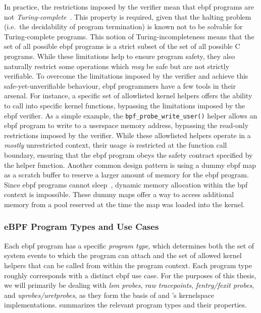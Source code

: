 In practice, the restrictions imposed by the verifier mean that \gls{ebpf} programs are not
\textit{Turing-complete}~\cite{gregg2019_bpf}.  This property is required, given that the
halting problem (i.e.~the decidability of program termination) is known not to be solvable
for Turing-complete programs. This notion of Turing-incompleteness means that the set of
all possible \gls{ebpf} programs is a strict subset of the set of all possible C programs. While
these limitations help to ensure program safety, they also naturally restrict some
operations which \textit{may} be safe but are not strictly verifiable. To overcome the
limitations imposed by the verifier and achieve this safe-yet-unverifiable behaviour, \gls{ebpf}
programmers have a few tools in their arsenal. For instance, a specific set of allowlisted
kernel helpers offers the ability to call into specific kernel functions, bypassing the
limitations imposed by the \gls{ebpf} verifier. As a simple example, the
\texttt{bpf\_probe\_write\_user()} helper allows an \gls{ebpf} program to write to a userspace
memory address, bypassing the read-only restrictions imposed by the verifier. While these
allowlisted helpers operate in a \textit{mostly} unrestricted context, their usage
\textit{is} restricted at the function call boundary, ensuring that the \gls{ebpf} program obeys
the safety contract specified by the helper function.  Another common design pattern is
using a dummy \gls{ebpf} map as a scratch buffer to reserve a larger amount of memory for the
\gls{ebpf} program.  Since \gls{ebpf} programs cannot sleep~\cite{gregg2019_bpf}, dynamic memory
allocation within the \gls{bpf} context is impossible. These dummy maps offer a way to access
additional memory from a pool reserved at the time the map was loaded into the kernel.

\subsubsection*{eBPF Program Types and Use Cases}

Each \gls{ebpf} program has a specific \textit{program type}, which determines both the set of
system events to which the program can attach and the set of allowed kernel helpers that
can be called from within the program context. Each program type roughly corresponds with
a distinct \gls{ebpf} use case. For the purposes of this thesis, we will primarily be dealing
with \textit{\gls{lsm} probes}, \textit{raw tracepoints}, \textit{fentry/fexit probes}, and
\textit{uprobes/uretprobes}, as they form the basis of \bpfbox{} and \bpfcontain{}'s
kernelspace implementations.  summarizes the relevant program types
and their properties.

